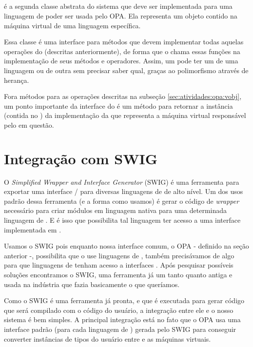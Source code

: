   \subsection{\VData{}}
  \label{sec:atividades:opa:vdata}
  \VData{} é a segunda classe abstrata do sistema que deve ser implementada para uma linguagem
  de \script{} poder ser usada pelo OPA. Ela representa um objeto contido na máquina virtual
  de uma linguagem específica.
  
  Essa classe é uma interface para métodos que devem implementar todas aquelas operações do 
  \VObj{} (descritas anteriormente), de forma que o \VObj{} chama essas funções na implementação
  de seus métodos e operadores. Assim, um \VObj{} pode ter um \VData{} de uma linguagem 
  ou de outra sem precisar saber qual, graças ao polimorfismo através de herança.
  
  Fora métodos para as operações descritas na subseção \ref{sec:atividades:opa:vobj}, um ponto
  importante da interface do \VData{} é um método para retornar a instância (contida no \SMgr{}) 
  da implementação da \VMac{} que representa a máquina virtual responsável pelo
  \VData{} em questão.
  
  
  \section{Integração com SWIG}
  \label{sec:actividads:integracaoswig}
  O \emph{Simplified Wrapper and Interface Generator} (SWIG\footnotemark{}) é uma ferramenta
  para exportar uma interface \C{}/\CXX{} para diversas linguagens de \script{} de alto nível.
  Um dos usos padrão dessa ferramenta (e a forma como usamos) é gerar o código de \textit{wrapper}
  necessário para criar módulos em linguagem nativa para uma determinada linguagem de \script{}.
  E é isso que possibilita tal linguagem ter acesso a uma interface implementada em \CXX{}.
  
  
  Usamos o SWIG pois enquanto nossa interface comum, o OPA - definido na seção anterior -, 
  possibilita que o \CXX{} use linguagens de \script{}, também precisávamos de algo para que linguagens 
  de \script{} tenham acesso a interfaces \CXX{}. Após pesquisar possíveis soluções encontramos
  o SWIG, uma ferramenta já um tanto quanto antiga e usada na indústria que fazia basicamente o
  que queríamos.
  
  Como o SWIG é uma ferramenta já pronta, e que é executada para gerar código que será compilado
  com o código do usuário, a integração entre ele e o nosso sistema é bem simples. A principal
  integração está no fato que o OPA usa uma interface padrão (para cada linguagem de \script{})
  gerada pelo SWIG para conseguir converter instâncias de tipos do usuário entre \CXX{} e as
  máquinas virtuais.
  
